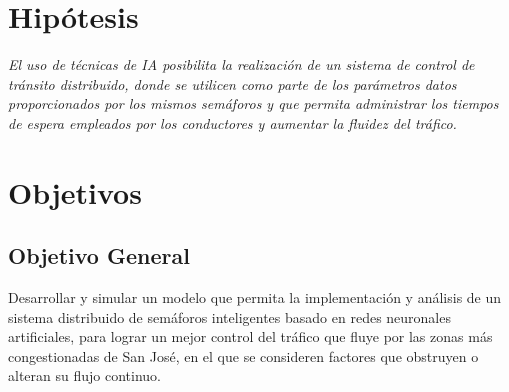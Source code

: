 \section{Hip\'{o}tesis}

\textit{El uso de t\'{e}cnicas de IA posibilita la realizaci\'{o}n de un sistema
de control de tr\'{a}nsito distribuido, donde se utilicen como parte de los par\'{a}metros datos
proporcionados por los mismos sem\'{a}foros y que permita administrar los tiempos de
espera empleados por los conductores y aumentar la fluidez del tr\'{a}fico.}

\section{Objetivos}
	\subsection{Objetivo General}
	
		Desarrollar y simular un modelo que permita la implementaci\'{o}n y an\'{a}lisis de un
	sistema distribuido de sem\'{a}foros inteligentes basado en redes neuronales
	artificiales, para lograr un mejor control del tr\'{a}fico que fluye
	por las zonas m\'{a}s congestionadas de San Jos\'{e}, en el que se consideren
	factores que obstruyen o alteran su flujo continuo.
	
